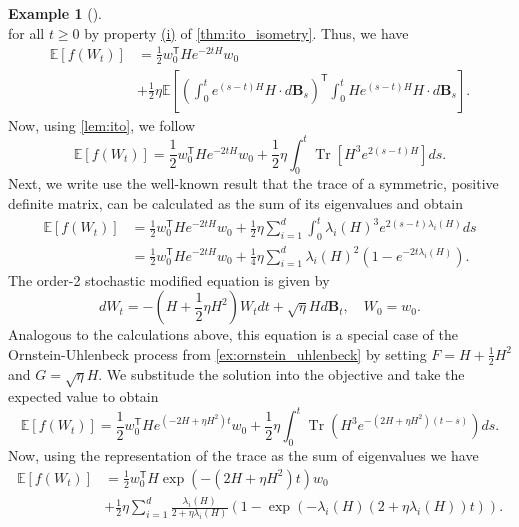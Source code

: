 \documentclass[12pt]{article}
\theoremstyle{definition}
\newtheorem{example}[example]{Example}
\numberwithin{equation}{section}
\newcommand{\T}{\mathsf{T}}
\newcommand{\ev}[1]{\mathbb{E}\left[{#1}\right]}
\DeclareMathOperator{\Tr}{Tr}
\begin{document}
\begin{example}[\autocite{liStochasticModifiedEquations2019}]
\begin{equation*}
\end{equation*}
for all $t \geq 0$ by property \hyperref[item:zero_integral]{(i)} of \autoref{thm:ito_isometry}.
Thus, we have 
\begin{equation*}
  \begin{split}
  \ev{f(W_t)} &= \frac{1}{2}w_0^\T He^{-2tH}w_0 \\
  &+ \frac{1}{2} \eta \ev{ \left(\int_0^t e^{(s-t)H}H\cdot d\pmb{B}_s\right)^\T \int_0^tH e^{(s-t)H}H\cdot d\pmb{B}_s}.
  \end{split}
\end{equation*}
Now, using \autoref{lem:ito}, we follow
\begin{equation*}
  \ev{f(W_t)} = \frac{1}{2}w_0^\T He^{-2tH}w_0 + \frac{1}{2}\eta \int_0^t\Tr\left[H^3e^{2(s-t)H}\right]ds.
\end{equation*}
Next, we write use the well-known result that the trace of a symmetric, positive definite matrix, can be calculated as the sum of its eigenvalues and obtain 
\begin{equation}
  \begin{split}
    \label{eq:analytical_expected_value}
    \ev{f(W_t)} &= \frac{1}{2}w_0^\T He^{-2tH}w_0 + \frac{1}{2}\eta \sum_{i=1}^d \int_0^t\lambda_i(H)^3e^{2(s-t)\lambda_i(H)}ds \\
    & = \frac{1}{2}w_0^\T He^{-2tH}w_0 + \frac{1}{4}\eta \sum_{i=1}^d \lambda_i(H)^2\left(1 - e^{-2t\lambda_i(H)}\right).
  \end{split}
\end{equation}
The order-2 stochastic modified equation is given by 
\begin{equation*}
  dW_t = -(H + \frac{1}{2}\eta H^2)W_tdt + \sqrt{\eta}Hd\mathbf{B}_t, \quad W_0 = w_0.
\end{equation*}
Analogous to the calculations above, this equation is a special case of the Ornstein-Uhlenbeck process from \autoref{ex:ornstein_uhlenbeck} by setting $F = H + \frac{1}{2}H^2$ and $G = \sqrt{\eta}H$. We substitude the solution into the objective and take the expected value to obtain
\begin{equation*}
  \ev{f(W_t)} = \frac{1}{2} w_0^\T H e^{(-2H + \eta H^2)t}w_0 + \frac{1}{2}\eta \int_0^t \Tr(H^3 e^{-(2H + \eta H^2)(t-s)})ds.
\end{equation*}
Now, using the representation of the trace as the sum of eigenvalues we have
\begin{align*}
  \ev{f(W_t)} &= \frac{1}{2}w_0^\T H \exp(-(2H + \eta H^2)t)w_0 \\
  &+ \frac{1}{2}\eta \sum_{i=1}^d \frac{\lambda_i(H)}{2 + \eta \lambda_i(H)}\left(1 - \exp(-\lambda_i(H)(2 + \eta \lambda_i(H))t)\right).

\end{align*}
\end{example}
\end{document}
